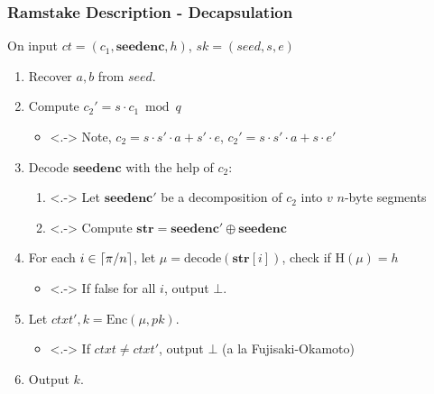\documentclass[11pt,t,xcolor=pdftex,svgnames,handout]{beamer}
\begin{document}
\begin{frame}
\frametitle{Ramstake Description - Decapsulation}
\onslide<+->
On input $ct=(c_1,\mathbf{seedenc}, h)$, $sk=(seed,s,e)$
\begin{enumerate}
\item<+-> Recover $a,b$ from $seed$.
\smallskip
\item<+-> Compute $c_2' = s\cdot c_1 \bmod{q}$
\begin{itemize}
\item<.->  Note, $c_2 = s\cdot s' \cdot a + s'\cdot e$,  $c_2'=s\cdot s'\cdot a + s\cdot e'$
\end{itemize}
\item<+-> Decode $\mathbf{seedenc}$ with the help of $c_2$:
\begin{enumerate}
\item<.-> Let $\mathbf{seedenc}'$ be a  decomposition of $c_2$ into
  $v$ $n$-byte segments
\smallskip
\item<.-> Compute $\mathbf{str}= \mathbf{seedenc}' \oplus
  \mathbf{seedenc}$
\end{enumerate} 
\item<+-> For each $i \in \lceil\pi/n\rceil$, let
  $\mu=\text{decode}(\mathbf{str}[i])$, check if
  $\text{H}(\mu) = h$ 
\smallskip
\begin{itemize}
\item<.-> If false for all $i$, output $\bot$.
\end{itemize}
\item<+-> Let $ctxt', k = \text{Enc}(\mu, pk)$. 
\begin{itemize}
\item<.-> If $ctxt \neq ctxt'$, output $\bot$ (a la Fujisaki-Okamoto)
\end{itemize}
\item<+-> Output $k$.
\end{enumerate}
\end{frame}
\end{document}
